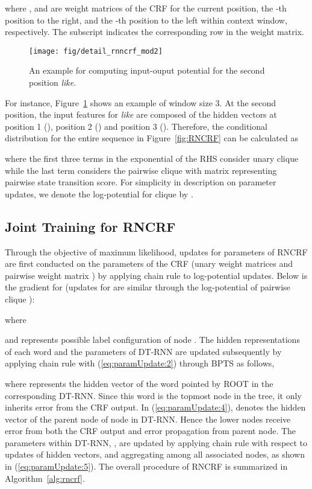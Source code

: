 \documentclass[11pt,letterpaper]{article}
\begin{document}
where ,  and  are weight matrices of the CRF for the current position, the -th position to the right, and the -th position to the left within context window, respectively. The subscript  indicates the corresponding row in the weight matrix.

\begin{figure}
	\centering
	\texttt{[image: fig/detail\_rnncrf\_mod2]}
	\caption{An example for computing input-ouput potential for the second position \textit{like}.}
	\label{fig:detail_rnncrf_mod2}
\end{figure}
For instance, Figure~\ref{fig:detail_rnncrf_mod2} shows an example of window size 3. At the second position, the input features for \textit{like} are composed of the hidden vectors at position 1 (), position 2 () and position 3 (). Therefore, the conditional distribution for the entire sequence  in Figure~\ref{fig:RNCRF} can be calculated as
\begin{small}

\end{small}
where the first three terms in the exponential of the RHS consider unary clique while the last term considers the pairwise clique with matrix  representing pairwise state transition score. For simplicity in description on parameter updates, we denote the log-potential for clique  by .

\subsection{Joint Training for RNCRF}\label{sec:training}
Through the objective of maximum likelihood, updates for parameters of RNCRF are first conducted on the parameters of the CRF (unary weight matrices  and pairwise weight matrix ) by applying chain rule to log-potential updates. Below is the gradient for  (updates for  are similar through the log-potential of pairwise clique ):

where

and  represents possible label configuration of node . The hidden representations of each word and the parameters of DT-RNN are updated subsequently by applying chain rule with (\ref{eq:paramUpdate:2}) through BPTS as follows,

where  represents the hidden vector of the word pointed by ROOT in the corresponding DT-RNN. Since this word is the topmost node in the tree, it only inherits error from the CRF output. In (\ref{eq:paramUpdate:4}),  denotes the hidden vector of the parent node of node  in DT-RNN. Hence the lower nodes receive error from both the CRF output and error propagation from parent node. The parameters within DT-RNN, , are updated by applying chain rule with respect to updates of hidden vectors, and aggregating among all associated nodes, as shown in (\ref{eq:paramUpdate:5}). The overall procedure of RNCRF is summarized in Algorithm~\ref{alg:rncrf}.
\end{document}
